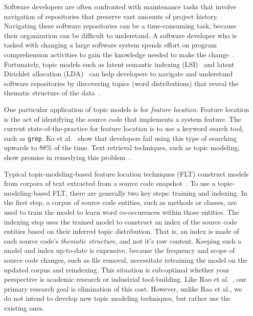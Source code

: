 
Software developers are often confronted with maintenance tasks that involve
navigation of repositories that preserve vast amounts of project history.
Navigating these software repositories can be a time-consuming task, because
their organization can be difficult to understand.  A software developer who is
tasked with changing a large software system spends effort on program
comprehension activities to gain the knowledge needed to make the
change~\cite{Corbi:1989}.  Fortunately, topic models such as latent semantic
indexing (LSI)~\cite{Deerwester-etal:1990} and latent Dirichlet allocation
(LDA)~\cite{Blei-etal:2003} can help developers to navigate and understand
software repositories by discovering topics (word distributions) that reveal the
thematic structure of the
data~\cite{Linstead-etal:2007,Thomas-etal:2011,Hindle-etal:2012}.

One particular application of topic models is for \emph{feature location}.
Feature location is the act of identifying the source code that implements
a system feature.  The current state-of-the-practice for feature location is to
use a keyword search tool, such as \texttt{grep}.  Ko et al.~\cite{Ko-etal:2006}
show that developers fail using this type of searching upwards to 88\% of the
time.  Text retrieval techniques, such as topic modeling, show promise in
remedying this problem~\cite{Marcus-etal:2004}.

Typical topic-modeling-based feature location techniques (FLT) construct models
from corpora of text extracted from a source code
snapshot~\cite{Dit-etal:2013b}.  To use a topic-modeling-based FLT, there are
generally two key steps: training and indexing.  In the first step, a corpus of
source code entities, such as methods or classes, are used to train the model to
learn word co-occurences within those entities.  The indexing step uses the
trained model to construct an index of the source code entities based on their
inferred topic distribution.  That is, an index is made of each source code's
\emph{thematic structure}, and not it's raw content.  Keeping such a model and
index up-to-date is expensive, because the frequency and scope of source code
changes, such as file removal, necessitate retraining the model on the updated
corpus and reindexing.  This situation is sub-optimal whether your perspective
is academic research or industrial tool-building.  Like Rao et
al.~\cite{Rao-etal:2013}, our primary research goal is elimination of this cost.
However, unlike Rao et al., we do not intend to develop new topic modeling
techniques, but rather use the existing ones.

